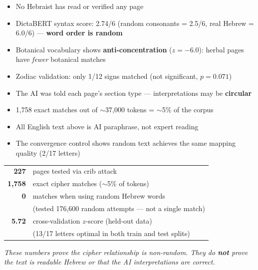 \documentclass[11pt,a4paper]{article}
\begin{document}
\begin{tcolorbox}[title={\large What is NOT proven},
  colframe=zero!70!black, colback=zero!5!white]
\begin{itemize}
\item No Hebraist has read or verified any page
\item DictaBERT syntax score: 2.74/6 (random consonants = 2.5/6, real Hebrew = 6.0/6) --- \textbf{word order is random}
\item Botanical vocabulary shows \textbf{anti-concentration} ($z=-6.0$): herbal pages have \emph{fewer} botanical matches
\item Zodiac validation: only 1/12 signs matched (not significant, $p=0.071$)
\item The AI was told each page's section type --- interpretations may be \textbf{circular}
\item 1{,}758 exact matches out of $\sim$37{,}000 tokens = $\sim$5\% of the corpus
\item All English text above is AI paraphrase, not expert reading
\item The convergence control shows random text achieves the same mapping quality (2/17 letters)
\end{itemize}
\end{tcolorbox}

\newpage

\begin{tcolorbox}[title={\large What we found}]
\begin{center}
\renewcommand{\arraystretch}{1.4}
\begin{tabular}{rl}
\textbf{\color{match}\Huge 227} & pages tested via crib attack \\
\textbf{\color{match}\Huge 1{,}758} & exact cipher matches ($\sim$5\% of tokens) \\
\textbf{\color{zero}\Huge 0} & matches when using random Hebrew words \\
& \small\color{gray}(tested 176{,}600 random attempts --- not a single match) \\[6pt]
\textbf{\color{accent}\Huge 5.72} & cross-validation $z$-score (held-out data) \\
& \small\color{gray}(13/17 letters optimal in both train and test splits)
\end{tabular}
\end{center}

\medskip\noindent\small
\textit{These numbers prove the cipher relationship is non-random.
They do \textbf{not} prove the text is readable Hebrew or that
the AI interpretations are correct.}
\end{tcolorbox}
\end{document}

